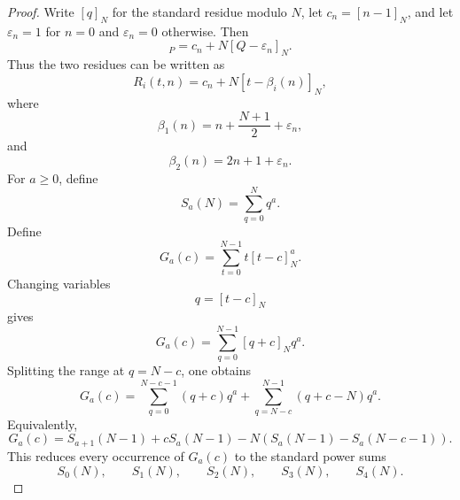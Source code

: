 \documentclass{article}
\theoremstyle{definition}
\numberwithin{equation}{section}
\begin{document}
\begin{proof}
Write $[q]_N$ for the standard residue modulo $N$, let $c_n=[n-1]_N$, and let $\varepsilon_n=1$ for $n=0$ and $\varepsilon_n=0$ otherwise.  Then
\begin{equation}
[n-1+NQ]_P=c_n+N[Q-\varepsilon_n]_N.
\end{equation}
Thus the two residues can be written as
\begin{equation}
R_i(t,n)=c_n+N[t-\beta_i(n)]_N,
\end{equation}
where
\begin{equation}
\beta_1(n)=n+\frac{N+1}{2}+\varepsilon_n,
\end{equation}
and
\begin{equation}
\beta_2(n)=2n+1+\varepsilon_n.
\end{equation}
For $a\geq0$, define
\begin{equation}
S_a(N)=\sum_{q=0}^{N}q^a.
\end{equation}
Define
\begin{equation}
G_a(c)=\sum_{t=0}^{N-1}t[t-c]_N^a.
\end{equation}
Changing variables
\begin{equation}
q=[t-c]_N
\end{equation}
gives
\begin{equation}
G_a(c)=\sum_{q=0}^{N-1}[q+c]_Nq^a.
\end{equation}
Splitting the range at $q=N-c$, one obtains
\begin{equation}
G_a(c)
=
\sum_{q=0}^{N-c-1}(q+c)q^a
+
\sum_{q=N-c}^{N-1}(q+c-N)q^a.
\end{equation}
Equivalently,
\begin{equation}
G_a(c)
=
S_{a+1}(N-1)+cS_a(N-1)-N\left(S_a(N-1)-S_a(N-c-1)\right).
\end{equation}
This reduces every occurrence of $G_a(c)$ to the standard power sums
\begin{equation}
S_0(N),\qquad S_1(N),\qquad S_2(N),\qquad S_3(N),\qquad S_4(N).
\end{equation}


\end{proof}
\end{document}
